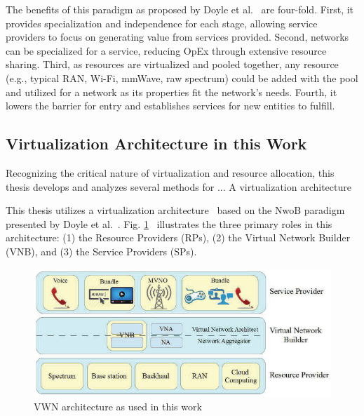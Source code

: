 \documentclass[12pt,dvipsnames]{report}
\begin{document}
The benefits of this paradigm as proposed by Doyle et al.~\cite{6737248} are four-fold.  First, it provides specialization and independence for each stage, allowing service providers to focus on generating value from services provided.  Second, networks can be specialized for a service, reducing OpEx through extensive resource sharing.  Third, as resources are virtualized and pooled together, any resource (e.g., typical RAN, Wi-Fi, mmWave, raw spectrum) could be added with the pool and utilized for a network as its properties fit the network's needs.  Fourth, it lowers the barrier for entry and establishes services for new entities to fulfill.

\subsection{Virtualization Architecture in this Work} \label{subsec:virtualization_architecture}

Recognizing the critical nature of virtualization and resource allocation, this thesis develops and analyzes several methods for ... A virtualization architecture%

This thesis utilizes a virtualization architecture~\cite{MJ_MECOMM_17} based on the NwoB paradigm presented by Doyle et al.~\cite{6737248}.  Fig. \ref{fig:VWNArchitecture}~\cite{MJ_MECOMM_17} illustrates the three primary roles in this architecture: (1) the Resource Providers (RPs), (2) the Virtual Network Builder (VNB), and (3) the Service Providers (SPs).

\begin{figure}
	\centering
	\includegraphics[width=\linewidth]{VWNArchitecture}
	\caption[VWN architecture as used in this work]{\small VWN architecture as used in this work~\cite{MJ_MECOMM_17}}
	\label{fig:VWNArchitecture}
\end{figure}
\end{document}
